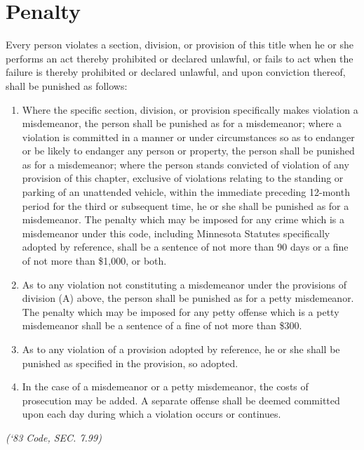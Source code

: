 \section{Penalty}
Every person violates a section, division, or provision of this title when he or she performs an act thereby prohibited or declared unlawful, or fails to act when the failure is thereby prohibited or declared unlawful, and upon conviction thereof, shall be punished as follows:
\begin{enumerate}[{\indent}A)]
    \item Where the specific section, division, or provision specifically makes violation a misdemeanor, the person shall be punished as for a misdemeanor; where a violation is committed in a manner or under circumstances so as to endanger or be likely to endanger any person or property, the person shall be punished as for a misdemeanor; where the person stands convicted of violation of any provision of this chapter, exclusive of violations relating to the standing or parking of an unattended vehicle, within the immediate preceding 12-month period for the third or subsequent time, he or she shall be punished as for a misdemeanor.  The penalty which may be imposed for any crime which is a misdemeanor under this code, including Minnesota Statutes specifically adopted by reference, shall be a sentence of not more than 90 days or a fine of not more than \$1,000, or both.
    \item As to any violation not constituting a misdemeanor under the provisions of division (A) above,  the person shall be punished as for a petty misdemeanor.  The penalty which may be imposed for any petty offense which is a petty misdemeanor shall be a sentence of a fine of not more than \$300.
    \item As to any violation of a provision adopted by reference, he or she shall be punished as specified in the provision, so adopted.
    \item In the case of a misdemeanor or a petty misdemeanor, the costs of prosecution may be added.  A separate offense shall be deemed committed upon each day during which a violation occurs or continues.
\end{enumerate}
\emph{(‘83 Code, SEC. 7.99)}

%
